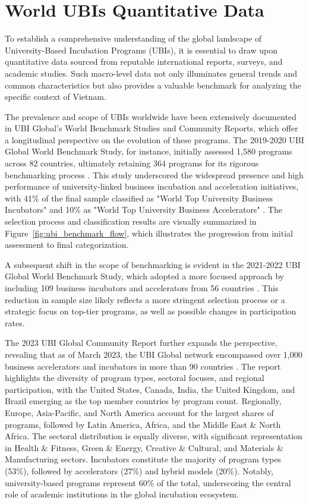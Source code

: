 \documentclass[../Main.tex]{subfiles}%
\begin{document}
	\section{World UBIs Quantitative Data}
	
	To establish a comprehensive understanding of the global landscape of University-Based Incubation Programs (UBIs), it is essential to draw upon quantitative data sourced from reputable international reports, surveys, and academic studies. Such macro-level data not only illuminates general trends and common characteristics but also provides a valuable benchmark for analyzing the specific context of Vietnam.
	
	The prevalence and scope of UBIs worldwide have been extensively documented in UBI Global's World Benchmark Studies and Community Reports, which offer a longitudinal perspective on the evolution of these programs. The 2019-2020 UBI Global World Benchmark Study, for instance, initially assessed 1,580 programs across 82 countries, ultimately retaining 364 programs for its rigorous benchmarking process \autocite{ubi2019world}. This study underscored the widespread presence and high performance of university-linked business incubation and acceleration initiatives, with 41\% of the final sample classified as "World Top University Business Incubators" and 10\% as "World Top University Business Accelerators" \autocite{ubi2019world}. The selection process and classification results are visually summarized in Figure~\ref{fig:ubi_benchmark_flow}, which illustrates the progression from initial assessment to final categorization.
	
	A subsequent shift in the scope of benchmarking is evident in the 2021-2022 UBI Global World Benchmark Study, which adopted a more focused approach by including 109 business incubators and accelerators from 56 countries \autocite{ubi2021world}. This reduction in sample size likely reflects a more stringent selection process or a strategic focus on top-tier programs, as well as possible changes in participation rates.
	
	The 2023 UBI Global Community Report further expands the perspective, revealing that as of March 2023, the UBI Global network encompassed over 1,000 business accelerators and incubators in more than 90 countries \autocite{Amin2024Incubators}. The report highlights the diversity of program types, sectoral focuses, and regional participation, with the United States, Canada, India, the United Kingdom, and Brazil emerging as the top member countries by program count. Regionally, Europe, Asia-Pacific, and North America account for the largest shares of programs, followed by Latin America, Africa, and the Middle East \& North Africa. The sectoral distribution is equally diverse, with significant representation in Health \& Fitness, Green \& Energy, Creative \& Cultural, and Materials \& Manufacturing sectors. Incubators constitute the majority of program types (53\%), followed by accelerators (27\%) and hybrid models (20\%). Notably, university-based programs represent 60\% of the total, underscoring the central role of academic institutions in the global incubation ecosystem.
	
\end{document}
